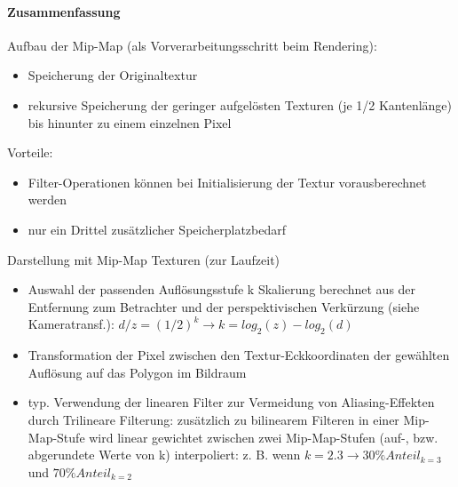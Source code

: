 \documentclass[10pt,landscape]{article}
\begin{document}
\begin{multicols}{3}
\paragraph{Zusammenfassung}
Aufbau der Mip-Map (als Vorverarbeitungsschritt beim Rendering):
\begin{itemize}
  \item Speicherung der Originaltextur
  \item rekursive Speicherung der geringer aufgelösten Texturen (je 1/2 Kantenlänge) bis hinunter zu einem einzelnen Pixel
\end{itemize}

Vorteile:
\begin{itemize}
  \item Filter-Operationen können bei Initialisierung der Textur vorausberechnet werden
  \item nur ein Drittel zusätzlicher Speicherplatzbedarf
\end{itemize}

Darstellung mit Mip-Map Texturen (zur Laufzeit)
\begin{itemize}
  \item Auswahl der passenden Auflösungsstufe k Skalierung berechnet aus der Entfernung zum Betrachter und der perspektivischen Verkürzung (siehe Kameratransf.): $d/z = (1/2)^k \rightarrow k = log_2(z)-log_2(d)$
  \item Transformation der Pixel zwischen den Textur-Eckkoordinaten der gewählten Auflösung auf das Polygon im Bildraum
  \item typ. Verwendung der linearen Filter zur Vermeidung von Aliasing-Effekten durch Trilineare Filterung: zusätzlich zu bilinearem Filteren in einer Mip-Map-Stufe wird linear gewichtet zwischen zwei Mip-Map-Stufen (auf-, bzw. abgerundete Werte von k) interpoliert: z. B. wenn $k = 2.3 \rightarrow 30\% Anteil_{k=3}$ und $70\% Anteil_{k=2}$
\end{itemize}



\end{multicols}
\end{document}
